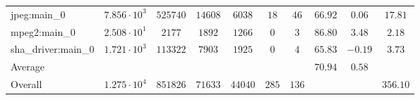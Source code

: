 \begin{tabular}{|l|c|c|c|c|c|c|c|c|c|}
jpeg:main\_0            & $ 7.856 \cdot 10^{3} $ & $ 525740 $ & $ 14608 $ & $ 6038  $ & $ 18  $ & $ 46  $ & $ 66.92       $ & $ 0.06    $ & $ 17.81   $ \\
mpeg2:main\_0           & $ 2.508 \cdot 10^{1} $ & $ 2177   $ & $ 1892  $ & $ 1266  $ & $ 0   $ & $ 3   $ & $ 86.80       $ & $ 3.48    $ & $ 2.18    $ \\
sha\_driver:main\_0     & $ 1.721 \cdot 10^{3} $ & $ 113322 $ & $ 7903  $ & $ 1925  $ & $ 0   $ & $ 4   $ & $ 65.83       $ & $ -0.19   $ & $ 3.73    $ \\
\hline
Average                 & $                    $ & $        $ & $       $ & $       $ & $     $ & $     $ & $ 70.94       $ & $ 0.58    $ & $         $ \\
\hline
Overall                 & $ 1.275 \cdot 10^{4} $ & $ 851826 $ & $ 71633 $ & $ 44040 $ & $ 285 $ & $ 136 $ & $             $ & $         $ & $ 356.10  $ \\
\hline
\end{tabular}
